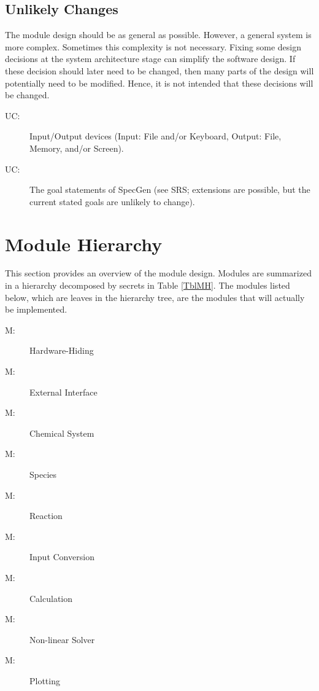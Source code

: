 \documentclass[12pt, titlepage]{article}
\newcounter{ucnum}
\newcommand{\uctheucnum}{UC\theucnum}
\newcounter{mnum}
\newcommand{\mthemnum}{M\themnum}
\newcommand{\progname}{SpecGen}
\begin{document}
\subsection{Unlikely Changes} \label{SecUchange}

The module design should be as general as possible. However, a general system is
more complex. Sometimes this complexity is not necessary. Fixing some design
decisions at the system architecture stage can simplify the software design. If
these decision should later need to be changed, then many parts of the design
will potentially need to be modified. Hence, it is not intended that these
decisions will be changed.

\begin{description}
\item[ \uctheucnum \label{ucIO}:] Input/Output devices
  (Input: File and/or Keyboard, Output: File, Memory, and/or Screen).
\item[ \uctheucnum \label{ucG}:] The goal statements of
  \progname{} (see SRS; extensions are possible, but the current stated goals
  are unlikely to change).
\end{description}

\section{Module Hierarchy} \label{SecMH}

This section provides an overview of the module design. Modules are summarized
in a hierarchy decomposed by secrets in Table \ref{TblMH}. The modules listed
below, which are leaves in the hierarchy tree, are the modules that will
actually be implemented.

\begin{description}
\item [ \mthemnum \label{mHH}:] Hardware-Hiding
\item [ \mthemnum \label{mEI}:] External Interface
\item [ \mthemnum \label{mCS}:] Chemical System
\item [ \mthemnum \label{mSP}:] Species
\item [ \mthemnum \label{mEP}:] Reaction
\item [ \mthemnum \label{mIC}:] Input Conversion
\item [ \mthemnum \label{mC}:] Calculation
\item [ \mthemnum \label{mNLS}:] Non-linear Solver
\item [ \mthemnum \label{mP}:] Plotting
\end{description}
\end{document}
